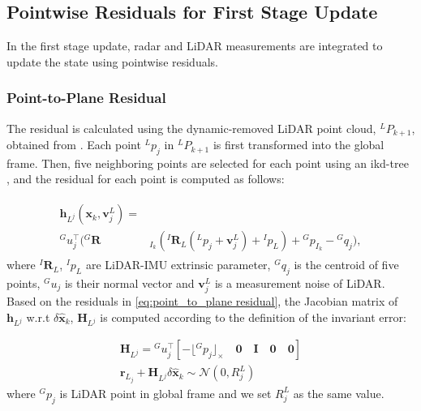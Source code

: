 \subsection{Pointwise Residuals for First Stage Update}
\label{subsec:first_update}
In the first stage update, radar and \ac{LiDAR} measurements are integrated to update the state using pointwise residuals.

\subsubsection{Point-to-Plane Residual}
The residual is calculated using the dynamic-removed \ac{LiDAR} point cloud, ${}^LP_{k+1}$, obtained from . Each point ${}^Lp_j$ in ${}^LP_{k+1}$ is first transformed into the global frame. Then, five neighboring points are selected for each point using an ikd-tree \cite{cai2021ikd}, and the residual for each point is computed as follows:

\vspace{-4mm}\small
\begin{eqnarray}
\begin{aligned}
  \label{eq:point_to_plane residual}
    \textbf{h}_{L^j}(\textbf{x}_k,\textbf{v}_j^L)=&\\{}^Gu_j^\top({}^G\textbf{R}&_{I_k}({}^I\textbf{R}_L({}^Lp_j+\textbf{v}_j^L)+{}^Ip_L)+{}^Gp_{I_k}-{}^Gq_j),
\end{aligned}
\end{eqnarray}
\normalsize
where ${}^I\textbf{R}_L$, ${}^Ip_L$ are \ac{LiDAR}-\ac{IMU} extrinsic parameter, ${}^Gq_j$ is the centroid of five points, ${}^Gu_j$ is their normal vector and $\textbf{v}_j^L$ is a measurement noise of \ac{LiDAR}. Based on the residuals in \eqref{eq:point_to_plane residual}, the Jacobian matrix of ${\textbf{h}}_{L^j}$ w.r.t $\delta \widehat{\textbf{x}}_{k}$, $\textbf{H}_{L^j}$ is computed according to the definition of the invariant error: 

\vspace{-4mm}\small
\begin{eqnarray}
  \label{eq:LiDAR Measurement Model}
    \textbf{H}_{L^j}=%
    {}^Gu_j^\top\left[-\lfloor{}^Gp_{j}\rfloor_\times \quad \textbf{0}\quad\textbf{I}\quad\textbf{0}\quad\textbf{0}\right] \nonumber\\
    \textbf{r}_{L_j}+\textbf{H}_{L^j}\delta\widehat{\textbf{x}}_k\sim\mathcal{N}(0,R_j^L)
\end{eqnarray}
\normalsize
where ${}^Gp_{j}$ is \ac{LiDAR} point in global frame and we set $R_j^L$ as the same value.

